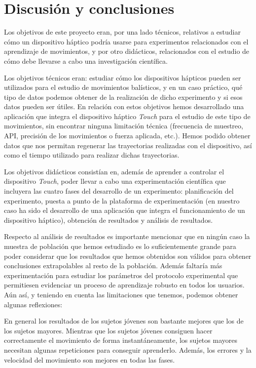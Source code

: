 \documentclass[a4paper,11pt, oneside]{book}
\begin{document}
\chapter{Discusión y conclusiones}

Los objetivos de este proyecto eran, por una lado técnicos, relativos a estudiar cómo un dispositivo háptico podría usarse para experimentos relacionados con el aprendizaje de movimientos, y por otro didácticos, relacionados con el estudio de cómo debe llevarse a cabo una investigación científica.


Los objetivos técnicos eran: estudiar cómo los dispositivos hápticos pueden ser utilizados para el estudio de movimientos balísticos, y en un caso práctico, qué tipo de datos podemos obtener de la realización de dicho experimento y si esos datos pueden ser útiles. En relación con estos objetivos hemos desarrollado una aplicación que integra el dispositivo háptico \textit{Touch} para el estudio de este tipo de movimientos, sin encontrar ninguna limitación técnica (frecuencia de muestreo, API, precisión de los movimientos o fuerza aplicada, etc.). Hemos podido obtener datos que nos permitan regenerar las trayectorias realizadas con el dispositivo, así como el tiempo utilizado para 
realizar dichas trayectorias. 


Los objetivos didácticos consistían en, además de aprender a controlar el dispositivo \textit{Touch}, poder llevar a cabo una experimentación científica que incluyera las cuatro fases del desarrollo de un experimento: planificación del experimento, puesta a punto de la plataforma de experimentación (en nuestro caso ha sido el desarrollo de una aplicación que integra el funcionamiento de un dispositivo háptico), obtención de resultados y análisis de resultados.

Respecto al análisis de resultados es importante mencionar que en ningún caso la muestra de población que hemos estudiado es lo suficientemente grande para poder considerar que los resultados que hemos obtenidos son válidos para obtener conclusiones extrapolables al resto de la población. Además faltaría más experimentación para estudiar los parámetros del protocolo experimental que permitiesen evidenciar un proceso de aprendizaje robusto en todos los usuarios. Aún así, y teniendo en cuenta las limitaciones que tenemos, podemos obtener algunas reflexiones:



En general los resultados de los sujetos jóvenes son bastante mejores que los de los sujetos mayores. Mientras que los sujetos jóvenes consiguen hacer correctamente el movimiento de forma instantáneamente, los sujetos mayores necesitan algunas repeticiones para conseguir aprenderlo. Además, los errores y la velocidad del movimiento son mejores en todas las fases.
\end{document}

